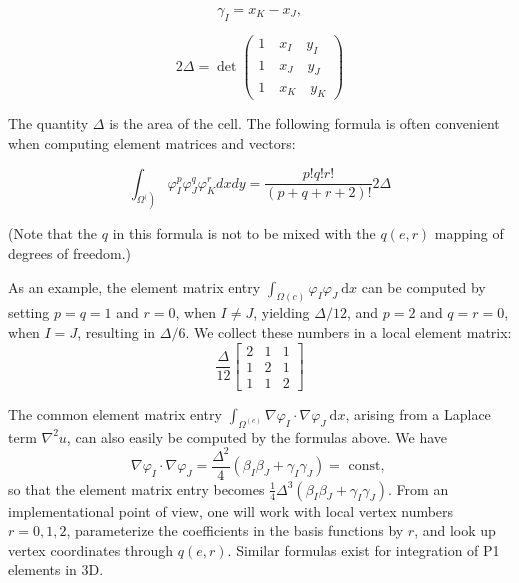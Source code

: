 \documentclass[../main.tex]{subfiles}
\begin{document}
	\begin{equation}
		\label{eqa208}
			\gamma_{I} =x_{K}-x_{J},
	\end{equation}

	\begin{equation}
		\label{eqa209}
			2 \Delta =\operatorname{det}\left(\begin{array}{ccc}
				1\quad  x_{I}\quad  y_{I} \\
				1\quad  x_{J}\quad  y_{J} \\
				1\quad  x_{K}\quad  y_{K}
			\end{array}\right)
	\end{equation}

	\noindent The quantity $\Delta$ is the area of the cell. \smallbreak
	The following formula is often convenient when computing element matrices and vectors:
	
	\begin{equation}
		\label{eqa210}
		\int_{\left.\Omega^{(}\right)} \varphi_{I}^{p} \varphi_{J}^{q} \varphi_{K}^{r} d x d y=\frac{p ! q ! r !}{(p+q+r+2) !} 2 \Delta
	\end{equation}

	\noindent (Note that the $q$ in this formula is not to be mixed with the $q(e, r)$ mapping of degrees of freedom.)
	
	As an example, the element matrix entry $\int_{\Omega(c)} \varphi_{I} \varphi_{J} \mathrm{~d} x$ can be computed by setting $p=q=1$ and $r=0$, when $I \neq J$, yielding $\Delta / 12$, and $p=2$ and $q=r=0$, when $I=J$, resulting in $\Delta / 6$. We collect these numbers in a local element matrix:
	$$
	\frac{\Delta}{12}\left[\begin{array}{lll}
		2 & 1 & 1 \\
		1 & 2 & 1 \\
		1 & 1 & 2
	\end{array}\right]
	$$
	
	The common element matrix entry $\int_{\Omega^{(e)}} \nabla \varphi_{I} \cdot \nabla \varphi_{J} \mathrm{~d} x$, arising from a Laplace term $\nabla^{2} u$, can also easily be computed by the formulas above. We have
	$$
	\nabla \varphi_{I} \cdot \nabla \varphi_{J}=\frac{\Delta^{2}}{4}\left(\beta_{I} \beta_{J}+\gamma_{I} \gamma_{J}\right)=\text { const, }
	$$
	so that the element matrix entry becomes $\frac{1}{4} \Delta^{3}\left(\beta_{I} \beta_{J}+\gamma_{I} \gamma_{J}\right)$.\smallbreak
	From an implementational point of view, one will work with local vertex numbers $r=0,1,2$, parameterize the coefficients in the basis functions by $r$, and look up vertex coordinates through $q(e, r)$.\smallbreak
	Similar formulas exist for integration of P1 elements in 3D.


	
\clearpage
\end{document}
